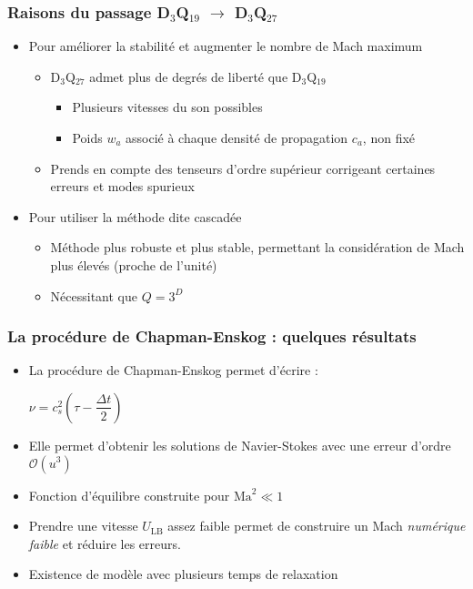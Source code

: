\documentclass[12pt, xcolor=svgnames]{beamer}
\newcommand{\ckng}{Chapman-Enskog}
\newcommand{\bwarrow}{\item[\color{DarkRed} \ding{227}]}
\newcommand{\warrow}{\item[\color{blue!50!black!70} \tiny{\ding{109}}]}
\newcommand{\sarrow}{\item[\color{blue!50!black!70!orange!60} \tiny{\ding{55}}]}
\newcommand{\bepar}[1]{
	\left( #1 \right)  
}
\begin{document}
\begin{frame}[noframenumbering]
\frametitle{Raisons du passage D$_3$Q$_{19}$ $\rightarrow$ D$_3$Q$_{27}$}

\begin{itemize}
\bwarrow Pour améliorer la stabilité et augmenter le nombre de Mach maximum 
	\begin{itemize}
		\warrow D$_3$Q$_{27}$ admet plus de degrés de liberté que D$_3$Q$_{19}$ 
		\begin{itemize}
			\sarrow Plusieurs vitesses du son possibles
			\sarrow Poids $w_a$ associé à chaque densité de propagation $c_a$, non fixé 
		\end{itemize}
		\warrow Prends en compte des tenseurs d'ordre supérieur corrigeant certaines erreurs et modes spurieux \\[5mm]
	\end{itemize}
\bwarrow Pour utiliser la méthode dite cascadée 
	\begin{itemize}
		\warrow Méthode plus robuste et plus stable, permettant la considération de Mach plus élevés (proche de l'unité) 
		\warrow Nécessitant que $Q = 3^D$
	\end{itemize}
\end{itemize}
 \end{frame}

\begin{frame}[noframenumbering]
\frametitle{La procédure de \ckng $ $ : quelques résultats}
\begin{itemize}
\bwarrow La procédure de Chapman-Enskog permet d'écrire : \\
\begin{center} $\displaystyle 	\nu = c_s^2 \bepar{\tau - \dfrac{\Delta t}{2}} $ \end{center}
\bwarrow Elle permet d'obtenir les solutions de Navier-Stokes avec une erreur d'ordre $\mathcal{O}\bepar{u^3}$
\bwarrow Fonction d'équilibre construite pour $\text{Ma}^2 \ll 1$
\bwarrow Prendre une vitesse $U_{\text{LB}} $ assez faible permet de construire un Mach \textit{numérique faible} et réduire les erreurs. \\[3mm]
\bwarrow Existence de modèle avec plusieurs temps de relaxation
\end{itemize}
\end{frame}
\end{document}
